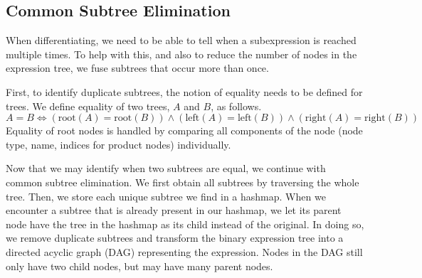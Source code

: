 \documentclass[12pt, a4paper]{report} %
\begin{document}
\subsection{Common Subtree Elimination}
When differentiating, we need to be able to tell when a subexpression is reached multiple times.
To help with this, and also to reduce the number of nodes in the expression tree, we fuse subtrees that occur more than once.

First, to identify duplicate subtrees, the notion of equality needs to be defined for trees.
We define equality of two trees, $A$ and $B$, as follows.
$$
A = B \iff (\text{root}(A) = \text{root}(B)) \land (\text{left}(A) = \text{left}(B)) \land (\text{right}(A) = \text{right}(B))
$$
Equality of root nodes is handled by comparing all components of the node (node type, name, indices for product nodes) individually.

Now that we may identify when two subtrees are equal, we continue with common subtree elimination.
We first obtain all subtrees by traversing the whole tree.
Then, we store each unique subtree we find in a hashmap.
When we encounter a subtree that is already present in our hashmap, we let its parent node have the tree in the hashmap as its child instead of the original.
In doing so, we remove duplicate subtrees and transform the binary expression tree into a directed acyclic graph (DAG) representing the expression.
Nodes in the DAG still only have two child nodes, but may have many parent nodes.
\end{document}
